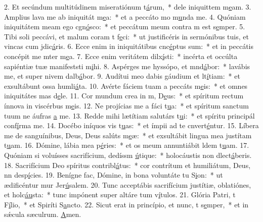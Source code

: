 2. Et secúndum multitúdinem miseratiónum t\uline{á}rum,~* dele iniquittem m\uline{e}am.
3. Amplius lava me ab iniquitát m\uline{e}a:~* et a peccáto mo m\uline{u}nda me.
4. Quóniam iniquitátem meam ego cgn\uline{ó}sco:~* et peccátum meum contra m est s\uline{e}mper.
5. Tibi soli peccávi, et malum coram t f\uline{e}ci:~* ut justificéris in sermónibus tuis, et vincas cum jdic\uline{á}ris.
6. Ecce enim in iniquitátibus cnc\uline{é}ptus sum:~* et in peccátis concépit me mter m\uline{e}a.
7. Ecce enim veritátem dilx\uline{í}sti:~* incérta et occúlta sapiéntiæ tuæ manifeststi m\uline{i}hi.
8. Aspérges me hyssópo, et mnd\uline{á}bor:~* lavábis me, et super nivem dalb\uline{á}bor.
9. Audítui meo dabis gáudium et lt\uline{í}tiam:~* et exsultábunt ossa humli\uline{á}ta.
10. Avérte fáciem tuam a peccáts m\uline{e}is:~* et omnes iniquitátes mas d\uline{e}le.
11. Cor mundum crea in m, D\uline{e}us:~* et spíritum rectum ínnova in viscérbus m\uline{e}is.
12. Ne projícias me a fáci t\uline{u}a:~* et spíritum sanctum tuum ne áufras \uline{a} me.
13. Redde mihi lætítiam salutárs t\uline{u}i:~* et spíritu principál conf\uline{í}rma me.
14. Docébo iníquos vis t\uline{u}as:~* et ímpii ad te cnvert\uline{é}ntur.
15. Líbera me de sanguínibus, Deus, Deus salúts m\uline{e}æ:~* et exsultábit lingua mea justítam t\uline{u}am.
16. Dómine, lábia mea p\uline{é}ries:~* et os meum annuntiábit ldem t\uline{u}am.
17. Quóniam si voluísses sacrifícium, dedíssm \uline{ú}tique:~* holocáustis non dlect\uline{á}beris.
18. Sacrifícium Deo spíritus contribl\uline{á}tus:~* cor contrítum et humiliátum, Deus, nn desp\uline{í}cies.
19. Benígne fac, Dómine, in bona voluntáte tu S\uline{i}on:~* ut ædificéntur mur Jer\uline{ú}salem.
20. Tunc acceptábis sacrifícium justítiæ, oblatiónes, et holc\uline{áu}sta:~* tunc impónent super altáre tum v\uline{í}tulos.
21. Glória Patri, t F\uline{í}lio,~* et Spiríti S\uline{a}ncto.
22. Sicut erat in princípio, et nunc, t s\uline{e}mper,~* et in sǽcula sæculrum. \uline{A}men.
